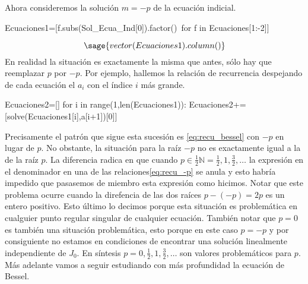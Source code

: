 \documentclass{article}
\newcounter{lem_cont}
\newcounter{ejem_cont}
\begin{document}
Ahora consideremos la solución $m=-p$ de la ecuación indicial.
\begin{sageblock}
Ecuaciones1=[f.subs(Sol_Ecua_Ind[0]).factor()\
for f in Ecuaciones[1:-2]]
\end{sageblock}
 \[\sage{vector(Ecuaciones1).column()}\]
En realidad la situación es exactamente la misma que antes, sólo hay que reemplazar $p$ por $-p$. Por ejemplo, hallemos la relación de recurrencia despejando de cada ecuación el $a_i$ con el índice $i$ más grande. 
\begin{sageblock}
Ecuaciones2=[]
for i in range(1,len(Ecuaciones1)):
    Ecuaciones2+=[solve(Ecuaciones1[i],a[i+1])[0]]
 \end{sageblock}
Precisamente el patrón que sigue esta sucesión es \eqref{eq:recu_bessel} con $-p$ en lugar de $p$. No obstante, la situación para la raíz $-p$ no es exactamente igual a la de la raíz $p$. La diferencia radica en que cuando $p\in\frac12\mathbb{N}=\frac12,1,\frac32,\ldots$  la expresión en el denominador en una de las relaciones\eqref{eq:recu_-p} se anula y esto  habría impedido que pasasemos de miembro esta expresión como hicimos. Notar que este problema ocurre cuando la direfencia de las dos raíces $p-(-p)=2p$ es un entero positivo.  Esto último lo decimos porque esta situación es problemática en cualguier punto regular singular de cualquier ecuación. También notar que $p=0$ es también una situación problemática, esto porque en este caso $p=-p$ y por consiguiente no estamos en condiciones de encontrar una solución linealmente independiente de $J_0$. En síntesis $p=0,\frac12,1,\frac32,\ldots$ son valores problemáticos para $p$. Más adelante vamos a seguir estudiando con más profundidad la ecuación de Bessel.




\end{document}
